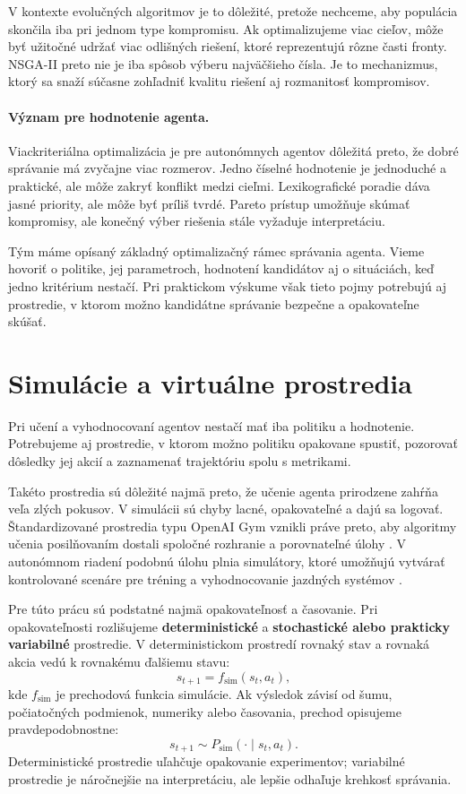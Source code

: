 V kontexte evolučných algoritmov je to dôležité, pretože nechceme, aby populácia skončila iba pri jednom type kompromisu. Ak optimalizujeme viac cieľov, môže byť užitočné udržať viac odlišných riešení, ktoré reprezentujú rôzne časti fronty. NSGA-II preto nie je iba spôsob výberu najväčšieho čísla. Je to mechanizmus, ktorý sa snaží súčasne zohľadniť kvalitu riešení aj rozmanitosť kompromisov.

\paragraph{Význam pre hodnotenie agenta.}
Viackriteriálna optimalizácia je pre autonómnych agentov dôležitá preto, že dobré správanie má zvyčajne viac rozmerov. Jedno číselné hodnotenie je jednoduché a praktické, ale môže zakryť konflikt medzi cieľmi. Lexikografické poradie dáva jasné priority, ale môže byť príliš tvrdé. Pareto prístup umožňuje skúmať kompromisy, ale konečný výber riešenia stále vyžaduje interpretáciu.

Tým máme opísaný základný optimalizačný rámec správania agenta. Vieme hovoriť o politike, jej parametroch, hodnotení kandidátov aj o situáciách, keď jedno kritérium nestačí. Pri praktickom výskume však tieto pojmy potrebujú aj prostredie, v ktorom možno kandidátne správanie bezpečne a opakovateľne skúšať.

\section{Simulácie a virtuálne prostredia}

Pri učení a vyhodnocovaní agentov nestačí mať iba politiku a hodnotenie. Potrebujeme aj prostredie, v ktorom možno politiku opakovane spustiť, pozorovať dôsledky jej akcií a zaznamenať trajektóriu spolu s metrikami.

Takéto prostredia sú dôležité najmä preto, že učenie agenta prirodzene zahŕňa veľa zlých pokusov. V simulácii sú chyby lacné, opakovateľné a dajú sa logovať. Štandardizované prostredia typu OpenAI Gym vznikli práve preto, aby algoritmy učenia posilňovaním dostali spoločné rozhranie a porovnateľné úlohy \cite{brockman2016openai_gym}. V autonómnom riadení podobnú úlohu plnia simulátory, ktoré umožňujú vytvárať kontrolované scenáre pre tréning a vyhodnocovanie jazdných systémov \cite{dosovitskiy2017carla}.

Pre túto prácu sú podstatné najmä opakovateľnosť a časovanie. Pri opakovateľnosti rozlišujeme \textbf{deterministické} a \textbf{stochastické alebo prakticky variabilné} prostredie. V deterministickom prostredí rovnaký stav a rovnaká akcia vedú k rovnakému ďalšiemu stavu:
\[
    s_{t+1} = f_{\text{sim}}(s_t, a_t),
\]
kde $f_{\text{sim}}$ je prechodová funkcia simulácie. Ak výsledok závisí od šumu, počiatočných podmienok, numeriky alebo časovania, prechod opisujeme pravdepodobnostne:
\[
    s_{t+1} \sim P_{\text{sim}}(\cdot \mid s_t, a_t).
\]
Deterministické prostredie uľahčuje opakovanie experimentov; variabilné prostredie je náročnejšie na interpretáciu, ale lepšie odhaľuje krehkosť správania.

